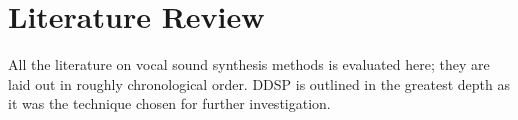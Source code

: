 \chapter{Literature Review}

\begin{center}
    \begin{minipage}{0.5\textwidth}
      \begin{small}
        All the literature on vocal sound synthesis methods is evaluated here; they are laid out in roughly chronological order. DDSP is outlined in the greatest depth as it was the technique chosen for further investigation.
      \end{small}
    \end{minipage}
    \vspace{0.5cm}
  \end{center}







